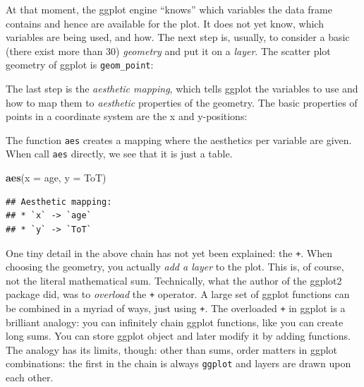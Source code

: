 \documentclass[]{svmono}
\newenvironment{Shaded}{\begin{snugshade}}{\end{snugshade}}
\newcommand{\KeywordTok}[1]{\textcolor[rgb]{0.13,0.29,0.53}{\textbf{#1}}}
\newcommand{\DataTypeTok}[1]{\textcolor[rgb]{0.13,0.29,0.53}{#1}}
\newcommand{\StringTok}[1]{\textcolor[rgb]{0.31,0.60,0.02}{#1}}
\newcommand{\OperatorTok}[1]{\textcolor[rgb]{0.81,0.36,0.00}{\textbf{#1}}}
\newcommand{\NormalTok}[1]{#1}
\theoremstyle{definition}
\theoremstyle{definition}
\theoremstyle{definition}
\theoremstyle{remark}
\begin{document}
At that moment, the ggplot engine ``knows'' which variables the data
frame contains and hence are available for the plot. It does not yet
know, which variables are being used, and how. The next step is,
usually, to consider a basic (there exist more than 30) \emph{geometry}
and put it on a \emph{layer}. The scatter plot geometry of ggplot is
\texttt{geom\_point}:

\begin{Shaded}
\end{Shaded}

The last step is the \emph{aesthetic mapping}, which tells ggplot the
variables to use and how to map them to \emph{aesthetic} properties of
the geometry. The basic properties of points in a coordinate system are
the x and y-positions:

\begin{Shaded}
\end{Shaded}

The function \texttt{aes} creates a mapping where the aesthetics per
variable are given. When call \texttt{aes} directly, we see that it is
just a table.

\begin{Shaded}
\begin{Highlighting}[]
\KeywordTok{aes}\NormalTok{(}\DataTypeTok{x =}\NormalTok{ age, }\DataTypeTok{y =}\NormalTok{ ToT)}
\end{Highlighting}
\end{Shaded}

\begin{verbatim}
## Aesthetic mapping: 
## * `x` -> `age`
## * `y` -> `ToT`
\end{verbatim}

One tiny detail in the above chain has not yet been explained: the
\texttt{+}. When choosing the geometry, you actually \emph{add a layer}
to the plot. This is, of course, not the literal mathematical sum.
Technically, what the author of the ggplot2 package did, was to
\emph{overload} the \texttt{+} operator. A large set of ggplot functions
can be combined in a myriad of ways, just using \texttt{+}. The
overloaded \texttt{+} in ggplot is a brilliant analogy: you can
infinitely chain ggplot functions, like you can create long sums. You
can store ggplot object and later modify it by adding functions. The
analogy has its limits, though: other than sums, order matters in ggplot
combinations: the first in the chain is always \texttt{ggplot} and
layers are drawn upon each other.
\end{document}
